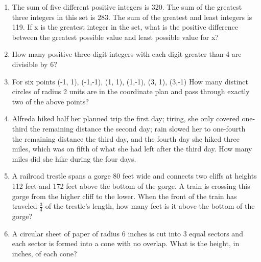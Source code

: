\documentclass[12pt]{article}
\begin{document}
\begin{enumerate}
\item The sum of five different positive integers is 320. The sum of
the greatest three integers in this set is 283. The sum of the
greatest and least integers is 119. If x is the greatest integer
in the set, what is the positive difference between the greatest
possible value and least possible value for x?
\bigskip
\vspace{1cm}

\item How many positive three-digit integers with each digit greater
than 4 are divisible by 6?
\vspace{1cm}

\item For six points (-1, 1), (-1,-1), (1, 1), (1,-1), (3, 1), (3,-1)
How many distinct circles of radius 2 units are in the
coordinate plan and pass through exactly two of the above points?
\vspace{1cm}


\item Alfreda hiked half her planned trip the first day; tiring, she only
covered one-third the remaining distance the second day; rain slowed her to one-fourth
the remaining distance the third day, and the fourth day she hiked three miles,
which was on fifth of what she had left after the third day. How many miles did she hike during
the four days.
\vspace{1cm}

\item A railroad trestle spans a gorge 80 feet wide
and connects two cliffs at heights 112 feet and 172 feet above the bottom of the gorge.
A train is crossing this gorge from the higher cliff to the lower. When the front of
the train has traveled $\frac{3}{4}$ of the trestle’s length, how many feet is it above the bottom of
the gorge?
\vspace{1cm}
\item A circular sheet of paper of radius 6 inches is cut into 3 equal sectors
and each sector is
formed into a cone with no overlap. What is the height, in inches, of each cone?

\end{enumerate}
\end{document}
